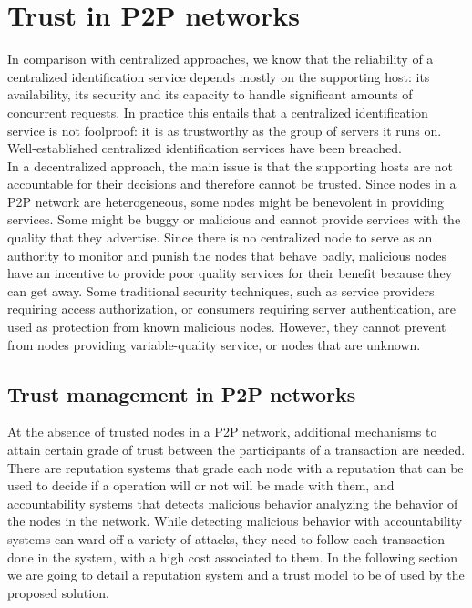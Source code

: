 \section{Trust in P2P networks}
\label{sec:trust_in_p2p}

In comparison with centralized approaches, we know that the reliability of a
centralized identification service depends mostly on the
supporting host: its availability, its security and its capacity  to handle
significant amounts of concurrent requests. 
In practice this entails that a centralized identification service is not
foolproof: it is as trustworthy as the group of servers it runs on.
Well-established centralized identification services have been breached.\\ %


In a decentralized approach, the main issue is that the supporting hosts are
not accountable for their decisions and therefore cannot be trusted.
Since nodes in a P2P network are heterogeneous, some nodes
might be benevolent in providing services. Some might be 
buggy or malicious and cannot provide services with the 
quality that they advertise. Since there is no centralized 
node to serve as an authority to monitor and punish the 
nodes that behave badly, malicious nodes have an incentive 
to provide poor quality services for their benefit because 
they can get away. Some traditional security techniques, 
such as service providers requiring access authorization, or 
consumers requiring server authentication, are used as 
protection from known malicious nodes. However,
 they cannot prevent from nodes providing variable-quality 
service, or nodes that are unknown.


\subsection{Trust management in P2P networks}
At the absence of trusted nodes in a P2P network, additional mechanisms to
attain certain grade of trust between the participants of a transaction are
needed. There are reputation systems that grade each node with a reputation
that can be used to decide if a operation will or not will be made with them,
and accountability systems that detects malicious behavior analyzing the
behavior of the nodes in the network. While  detecting malicious behavior with
accountability systems can ward off a variety of attacks, they need to follow
each transaction done in the system, with a high cost associated to them.
 In the following section we are going to
detail a reputation system and a trust model to be of used by the proposed
solution.


